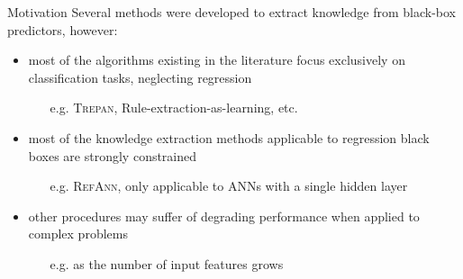 \documentclass[presentation]{beamer}
\begin{document}
\begin{frame}[c]{Motivation}
	Several methods were developed to extract knowledge from black-box predictors, however:
    \vfill
    \begin{itemize}
        \item most of the algorithms existing in the literature focus exclusively on classification tasks, neglecting regression
        \begin{itemize}
            \item[e.g.] \textsc{Trepan}, Rule-extraction-as-learning, etc.
        \end{itemize}
        
        \vfill
        
        \item most of the knowledge extraction methods applicable to regression black boxes are strongly constrained
        \begin{itemize}
            \item[e.g.] \textsc{RefAnn}, only applicable to ANNs with a single hidden layer
        \end{itemize}
        
        \vfill
        
        \item other procedures may suffer of degrading performance when applied to complex problems
        \begin{itemize}
			\item[e.g.] 
			\iter{} as the number of input features grows
		\end{itemize}
        
    \end{itemize}
\end{frame}
\end{document}
